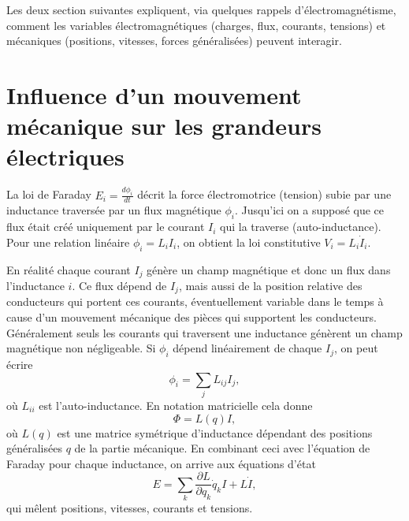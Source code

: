 Les deux section suivantes expliquent, via quelques rappels d'électromagnétisme, comment les variables électromagnétiques (charges, flux, courants, tensions) et mécaniques (positions, vitesses, forces généralisées) peuvent interagir.

\section{Influence d'un mouvement mécanique sur les grandeurs électriques} 

La loi de Faraday $E_i=\frac{d\phi_i}{dt}$ décrit la force électromotrice (tension) subie par une inductance traversée par un flux magnétique $\phi_i$. Jusqu'ici on a supposé que ce flux était créé uniquement par le courant $I_i$ qui la traverse (auto-inductance). Pour une relation linéaire $\phi_i=L_iI_i$, on obtient la loi constitutive $V_i=L_i \dot{I}_i$.

En réalité chaque courant $I_j$ génère un champ magnétique et donc un flux dans l'inductance $i$. Ce flux dépend de $I_j$, mais aussi de la position relative des conducteurs qui portent ces courants, éventuellement variable dans le temps à cause d'un mouvement mécanique des pièces qui supportent les conducteurs.
Généralement seuls les courants qui traversent une inductance génèrent un champ magnétique non négligeable. Si $\phi_i$ dépend linéairement de chaque $I_j$, on peut écrire
\begin{equation}
\phi_i=\sum_j L_{ij} I_j,
\label{eq:PhiLI}
\end{equation}
où $L_{ii}$ est l'auto-inductance. En notation matricielle cela donne
\begin{equation}
\Phi=L(q) I,
\label{eq:PhiLI2}
\end{equation}
où $L(q)$ est une matrice symétrique d'inductance dépendant des positions généralisées $q$ de la partie mécanique. En combinant ceci avec l'équation de Faraday pour chaque inductance, on arrive aux équations d'état
\begin{equation}
E=\sum_k \frac{\partial L}{\partial q_k} \dot{q}_k I + L\dot{I},
\label{eq:VqI}
\end{equation}
qui mêlent positions, vitesses, courants et tensions.

